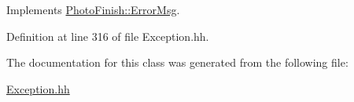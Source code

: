Implements \hyperlink{class_photo_finish_1_1_error_msg_ae84614a0c68520a7ad11e699c1504e82}{Photo\+Finish\+::\+Error\+Msg}.



Definition at line 316 of file Exception.\+hh.



The documentation for this class was generated from the following file\+:\begin{DoxyCompactItemize}
\item 
\hyperlink{_exception_8hh}{Exception.\+hh}\end{DoxyCompactItemize}
